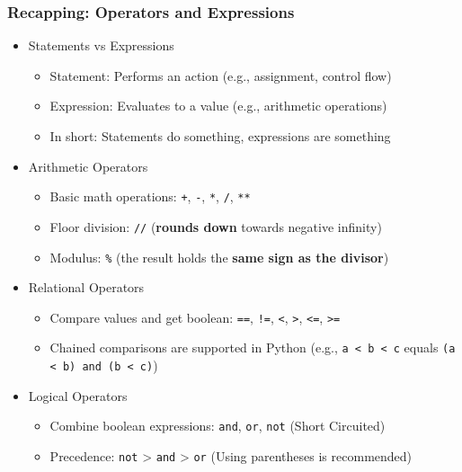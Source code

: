 \documentclass{beamer}
\begin{document}
\begin{frame}
    \frametitle{Recapping: Operators and Expressions}
    \begin{itemize}
        \item Statements vs Expressions
              \begin{itemize}
                  \item Statement: Performs an action (e.g., assignment, control flow)
                  \item Expression: Evaluates to a value (e.g., arithmetic operations)
                  \item In short: Statements do something, expressions are something
              \end{itemize}
        \item Arithmetic Operators
              \begin{itemize}
                  \item Basic math operations: \texttt{+}, \texttt{-}, \texttt{*}, \texttt{/}, \texttt{**}
                  \item Floor division: \texttt{//} (\textbf{rounds down} towards negative infinity)
                  \item Modulus: \texttt{\%} (the result holds the \textbf{same sign as the divisor})
              \end{itemize}
        \item Relational Operators
              \begin{itemize}
                  \item Compare values and get boolean: \texttt{==}, \texttt{!=}, \texttt{<}, \texttt{>}, \texttt{<=}, \texttt{>=}
                  \item Chained comparisons are supported in Python
                        (e.g., \texttt{a < b < c} equals \texttt{(a < b) and (b < c)})
              \end{itemize}
        \item Logical Operators
              \begin{itemize}
                  \item Combine boolean expressions: \texttt{and}, \texttt{or}, \texttt{not} (Short Circuited)
                  \item Precedence: \texttt{not} > \texttt{and} > \texttt{or} (Using parentheses is recommended)
              \end{itemize}
    \end{itemize}
\end{frame}
\end{document}
